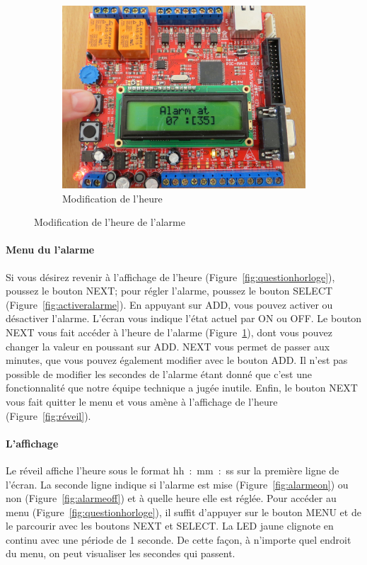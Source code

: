 \documentclass[12pt,a4paper]{article}
\begin{document}
\begin{figure}[!h]
\begin{subfigure}[b]{0.4\textwidth}
        \end{subfigure}
        \begin{subfigure}[b]{0.4\textwidth}
                \includegraphics[width=\textwidth]{photos/IMG_2157.JPG}
                \caption{Modification de l'heure}
                \label{fig:modificationalarme}
        \end{subfigure}
        \caption{Modification de l'heure de l'alarme}\label{fig:changeralarme}
\end{figure}

\paragraph{Menu du l'alarme} Si vous désirez revenir à l'affichage de l'heure (Figure~\ref{fig:questionhorloge}), poussez le bouton NEXT; pour régler l'alarme, poussez le bouton SELECT (Figure~\ref{fig:activeralarme}). En appuyant sur ADD, vous pouvez activer ou désactiver l'alarme. L'écran vous indique l'état actuel par ON ou OFF. Le bouton NEXT vous fait accéder à l'heure de l'alarme (Figure~\ref{fig:modificationalarme}), dont vous pouvez changer la valeur en poussant sur ADD. NEXT vous permet de passer aux minutes, que vous pouvez également modifier avec le bouton ADD. Il n'est pas possible de modifier les secondes de l'alarme étant donné que c'est une fonctionnalité que notre équipe technique a jugée inutile. Enfin, le bouton NEXT vous fait quitter le menu et vous amène à l'affichage de l'heure (Figure~\ref{fig:réveil}).

\paragraph{L'affichage}
Le réveil affiche l'heure sous le format hh~:~mm~:~ss sur la première ligne de l'écran. La seconde ligne indique si l'alarme est mise (Figure~\ref{fig:alarmeon}) ou non (Figure~\ref{fig:alarmeoff}) et à quelle heure elle est réglée. Pour accéder au menu (Figure~\ref{fig:questionhorloge}), il suffit d'appuyer sur le bouton MENU et de le parcourir avec les boutons NEXT et SELECT. La LED jaune clignote en continu avec une période de 1 seconde. De cette façon, à n'importe quel endroit du menu, on peut visualiser les secondes qui passent.
\end{document}
